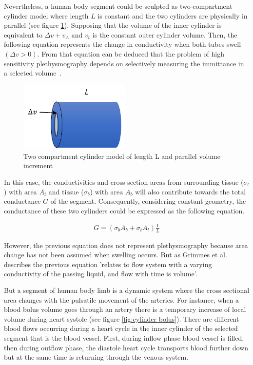 Nevertheless, a human body segment could be sculpted as two-compartment cylinder model where length $L$ is constant and the two cylinders are physically in parallel (see figure \ref{fig:two cylinder modell}). Supposing that the volume of the inner cylinder is equivalent to $\Delta v + v_A$ and $v_t$ is the constant outer cylinder volume. Then, the following equation represents the change in conductivity when both tubes swell $(\Delta v > 0)$. From that equation can be deduced that the problem of high sensitivity plethysmography depends on selectively measuring the immittance in a selected volume~\cite{martinsen2011bioimpedance}.

\begin{figure}[!htpb]
	\centering
	\includegraphics[width=5.5cm,keepaspectratio]{figure5}    
	\caption[Two compartment cylinder model]{Two compartment cylinder model of length L and parallel volume increment}
	\label{fig:two cylinder modell}
\end{figure}

In this case, the conductivities and cross section areas from surrounding tissue ($\sigma_t$) with area $A_t$ and tissue ($\sigma_b$) with area $A_b$ will also contribute towards the total conductance $G$ of the segment. Consequently, considering constant geometry, the conductance of these two cylinders could be expressed as the following equation.

\begin{align}
G = (\sigma_b A_b + \sigma_t A_t) \frac{1}{L}
\end{align}

However, the previous equation does not represent plethysmography because area change has not been assumed when swelling occurs. But as Grimmes et al.~\cite{martinsen2011bioimpedance} describes the previous equation 'relates to flow system with a varying conductivity of the passing liquid, and flow with time is volume'.

But a segment of human body limb is a dynamic system where the cross sectional area changes with the pulsatile movement of the arteries.  For instance, when a blood bolus volume goes through an artery there is a temporary increase of local volume during heart systole (see figure \ref{fig:cylinder bolus}). There are different blood flows occurring during a heart cycle in the inner cylinder of the selected segment that is the blood vessel. First, during inflow phase blood vessel is filled, then during outflow phase, the diastole heart cycle transports blood further down but at the same time is returning through the venous system.


